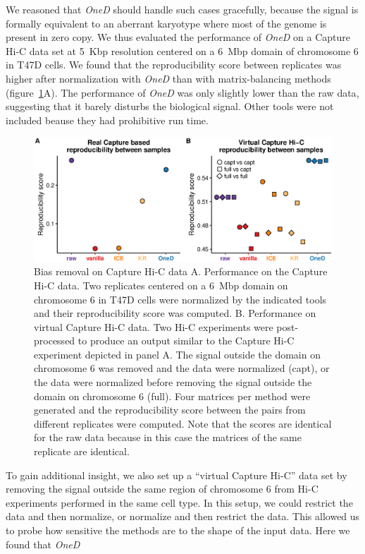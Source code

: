 \documentclass[a4,center,fleqn]{NAR}
\providecommand{\DIFadd}[1]{{\protect\color{red}#1}} %
\providecommand{\DIFdel}[1]{{\protect}}                      %
\providecommand{\DIFaddbegin}{} %
\providecommand{\DIFaddend}{} %
\providecommand{\DIFdelbegin}{} %
\providecommand{\DIFdelend}{} %
\providecommand{\DIFaddFL}[1]{\DIFadd{#1}} %
\begin{document}
\DIFadd{We reasoned that }\textit{\DIFadd{OneD}} \DIFadd{should handle such cases gracefully,
because the signal is formally equivalent to an aberrant karyotype where
most of the genome is present in zero copy. We thus evaluated the
performance of }\textit{\DIFadd{OneD}} \DIFadd{on a Capture Hi-C data set at 5~Kbp
resolution centered on a 6~Mbp domain of chromosome 6 in T47D cells. We
found that the reproducibility score between replicates was higher after
normalization }\DIFaddend with \textit{OneD} \DIFdelbegin \DIFdel{. The region around
72.5-75.0 Mbp showed an elevated amount of contacts in }\DIFdelend \DIFaddbegin \DIFadd{than with matrix-balancing methods
(figure~\ref{fig:chic}A). The performance of }\textit{\DIFadd{OneD}} \DIFadd{was only
slightly lower than }\DIFaddend the raw data\DIFdelbegin \DIFdel{. After
copy number correction, the signal is brought to the same level as the flanking regions. The result provided by }\DIFdelend \DIFaddbegin \DIFadd{, suggesting that it barely disturbs the
biological signal. Other tools were not included beause they had
prohibitive run time.
}

\begin{figure}
\centerline{\includegraphics[width=.49\textwidth]{figure_5.eps}}
\caption{\DIFaddFL{Bias removal on Capture Hi-C data A. Performance on the Capture
Hi-C data. Two replicates centered on a 6~Mbp domain on chromosome 6 in
T47D cells were normalized by the indicated tools and their
reproducibility score was computed. B. Performance on virtual Capture Hi-C
data. Two Hi-C experiments were post-processed to produce an output
similar to the Capture Hi-C experiment depicted in panel A. The signal
outside the domain on chromosome 6 was removed and the data were
normalized (capt), or the data were normalized before removing the signal
outside the domain on chromosome 6 (full). Four matrices per method were
generated and the reproducibility score between the pairs from different
replicates were computed. Note that the scores are identical for the raw
data because in this case the matrices of the same replicate are
identical.}}
\label{fig:chic}
\end{figure}

\DIFadd{To gain additional insight, we also set up a ``virtual Capture Hi-C'' data
set by removing the signal outside the same region of chromosome 6 from
Hi-C experiments performed in the same cell type. In this setup, we could
restrict the data and then normalize, or normalize and then restrict the
data. This allowed us to probe how sensitive the methods are to the shape
of the input data. Here we found that }\DIFaddend \textit{OneD} \DIFdelbegin \DIFdel{is not necessarily
the right one (see Discussion), but at least it does not correct copy
number variations as a side effect of some other criteria. }%
\end{document}
